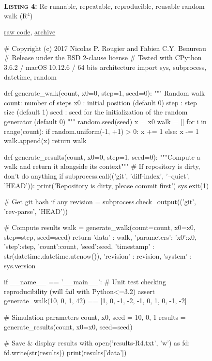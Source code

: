 \documentclass[a4paper,11pt]{article}
\begin{document}
\begin{figure}
\noindent \begin{minipage}[c]{\linewidth}
\begin{code}{\parbox{.8\textwidth}{\textbf{\textsc{Listing 4:}} Re-runnable, repeatable, reproducible, reusable random walk (R$^4$)}\parbox{.161\textwidth}{\hfill \href{https://raw.githubusercontent.com/rougier/random-walk/frontiers/random-walk-R4.py}{raw code}, \href{https://doi.org/10.5281/zenodo.848217}{archive}}}
# Copyright (c) 2017 Nicolas P. Rougier and Fabien C.Y. Benureau
# Release under the BSD 2-clause license
# Tested with CPython 3.6.2 / macOS 10.12.6 / 64 bits architecture
import sys, subprocess, datetime, random

def generate_walk(count, x0=0, step=1, seed=0):
    """ Random walk
        count: number of steps
        x0   : initial position (default 0)
        step : step size (default 1)
        seed : seed for the initialization of the random generator (default 0)
    """
    random.seed(seed)
    x = x0
    walk = []
    for i in range(count):
        if random.uniform(-1, +1) > 0:
            x += 1
        else:
            x -= 1
        walk.append(x)
    return walk

def generate_results(count, x0=0, step=1, seed=0):
    """Compute a walk and return it alongside its context"""
    # If repository is dirty, don't do anything
    if subprocess.call(('git', 'diff-index', '--quiet', 'HEAD')):
        print('Repository is dirty, please commit first')
        sys.exit(1)

    # Get git hash if any
    revision = subprocess.check_output(('git', 'rev-parse', 'HEAD'))

    # Compute results
    walk = generate_walk(count=count, x0=x0, step=step, seed=seed)
    return {'data'      : walk,
            'parameters': {'x0':x0, 'step':step, 'count':count, 'seed':seed},
            'timestamp' : str(datetime.datetime.utcnow()),
            'revision'  : revision,
            'system'    : sys.version}

if __name__ == '__main__':
    # Unit test checking reproducibility (will fail with Python<=3.2)
    assert generate_walk(10, 0, 1, 42) == [1, 0, -1, -2, -1, 0, 1, 0, -1, -2]

    # Simulation parameters
    count, x0, seed = 10, 0, 1
    results = generate_results(count, x0=x0, seed=seed)

    # Save & display results
    with open('results-R4.txt', 'w') as fd:
        fd.write(str(results))
    print(results['data'])
\end{code}
\end{minipage}\\
\end{figure}
\end{document}
